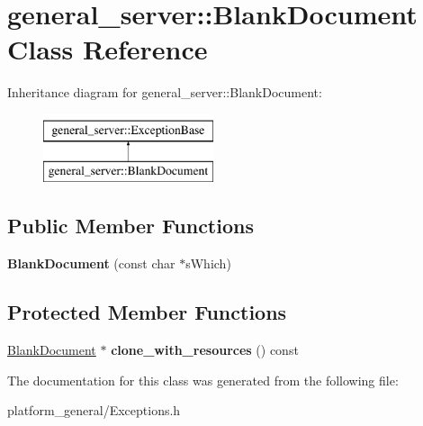 \hypertarget{classgeneral__server_1_1BlankDocument}{\section{general\-\_\-server\-:\-:\-Blank\-Document \-Class \-Reference}
\label{classgeneral__server_1_1BlankDocument}
}
\-Inheritance diagram for general\-\_\-server\-:\-:\-Blank\-Document\-:\begin{figure}[H]
\begin{center}
\leavevmode
\includegraphics[height=2.000000cm]{classgeneral__server_1_1BlankDocument}
\end{center}
\end{figure}
\subsection*{\-Public \-Member \-Functions}
\begin{DoxyCompactItemize}
\item 
\hypertarget{classgeneral__server_1_1BlankDocument_a5ce43747f14a609838a6c1f72133f23d}{{\bfseries \-Blank\-Document} (const char $\ast$s\-Which)}\label{classgeneral__server_1_1BlankDocument_a5ce43747f14a609838a6c1f72133f23d}

\end{DoxyCompactItemize}
\subsection*{\-Protected \-Member \-Functions}
\begin{DoxyCompactItemize}
\item 
\hypertarget{classgeneral__server_1_1BlankDocument_aaa9a70d2d5c52c1ea82e176468916f02}{\hyperlink{classgeneral__server_1_1BlankDocument}{\-Blank\-Document} $\ast$ {\bfseries clone\-\_\-with\-\_\-resources} () const }\label{classgeneral__server_1_1BlankDocument_aaa9a70d2d5c52c1ea82e176468916f02}

\end{DoxyCompactItemize}


\-The documentation for this class was generated from the following file\-:\begin{DoxyCompactItemize}
\item 
platform\-\_\-general/\-Exceptions.\-h\end{DoxyCompactItemize}

